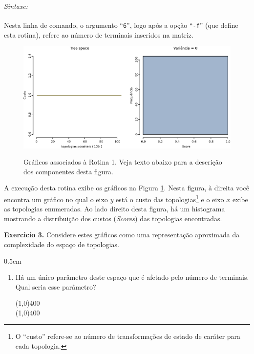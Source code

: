 \begin{refsection}
\indent\textit{Sintaxe:}\\
\indent\indent\indent{}\\

Nesta linha de comando, o argumento ``\texttt{6}'', logo após a opção ``\texttt{-f}'' (que define esta rotina), refere ao número de terminais inseridos na matriz.\\

  \begin{figure}[H]
      {\includegraphics[scale=0.80]{figures/tut3/flat.eps}}
      {\caption[Rotina 1]{Gráficos associados à Rotina 1. Veja texto abaixo para a descrição dos componentes desta figura.}\label{tut3:fig:flat}}
  \end{figure}


	A execução desta rotina exibe os gráficos na Figura \ref{tut3:fig:flat}. Nesta figura, à direita você encontra um gráfico no qual o eixo $y$ está o custo das topologias\footnote{O ``custo'' refere-se ao número de transformações de estado de caráter para cada topologia.} e o eixo $x$ exibe as topologias enumeradas. Ao lado direito desta figura, há um histograma mostrando a distribuição dos custos (\textit{Scores}) das topologias encontradas.\\

\begin{blackBlock}{\textbf{Exercicio 3.}}\label{tut3:ex:3.\arabic{ex}}
	Considere estes gráficos como uma representação aproximada da complexidade do espaço de topologias.
\begin {myindentpar}{0.5cm}
\begin{enumerate}[\itshape i.]
 \item{Há um único parâmetro deste espaço que é afetado pelo número de terminais. Qual seria esse parâmetro?}\label{tut3:ex1}\\
  \begin{center}
  \line(1,0){400}\\
  \line(1,0){400}\\
  \end{center}


\end{enumerate}
\end{myindentpar}
\end{blackBlock}
\end{refsection}
